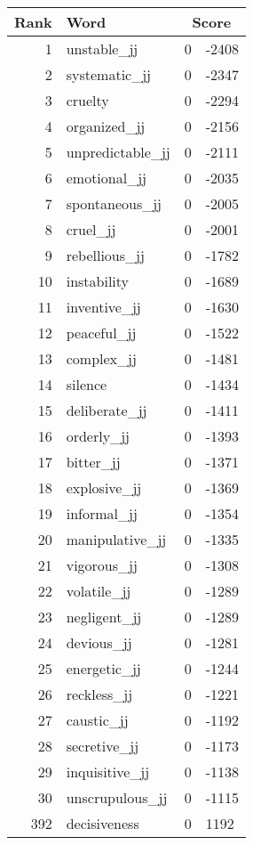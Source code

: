 \begin{longtable}[!htbp]{| rlr@{.}l |}
    \hline
    \textbf{Rank} & \textbf{Word} & \multicolumn{2}{c|}{\textbf{Score}} \\
    \hline
    \endhead
    1 & unstable\_jj & 0 & -2408 \\
    2 & systematic\_jj & 0 & -2347 \\
    3 & cruelty & 0 & -2294 \\
    4 & organized\_jj & 0 & -2156 \\
    5 & unpredictable\_jj & 0 & -2111 \\
    6 & emotional\_jj & 0 & -2035 \\
    7 & spontaneous\_jj & 0 & -2005 \\
    8 & cruel\_jj & 0 & -2001 \\
    9 & rebellious\_jj & 0 & -1782 \\
    10 & instability & 0 & -1689 \\
    11 & inventive\_jj & 0 & -1630 \\
    12 & peaceful\_jj & 0 & -1522 \\
    13 & complex\_jj & 0 & -1481 \\
    14 & silence & 0 & -1434 \\
    15 & deliberate\_jj & 0 & -1411 \\
    16 & orderly\_jj & 0 & -1393 \\
    17 & bitter\_jj & 0 & -1371 \\
    18 & explosive\_jj & 0 & -1369 \\
    19 & informal\_jj & 0 & -1354 \\
    20 & manipulative\_jj & 0 & -1335 \\
    21 & vigorous\_jj & 0 & -1308 \\
    22 & volatile\_jj & 0 & -1289 \\
    23 & negligent\_jj & 0 & -1289 \\
    24 & devious\_jj & 0 & -1281 \\
    25 & energetic\_jj & 0 & -1244 \\
    26 & reckless\_jj & 0 & -1221 \\
    27 & caustic\_jj & 0 & -1192 \\
    28 & secretive\_jj & 0 & -1173 \\
    29 & inquisitive\_jj & 0 & -1138 \\
    30 & unscrupulous\_jj & 0 & -1115 \\
    392 & decisiveness & 0 & 1192 \\

\end{longtable}

